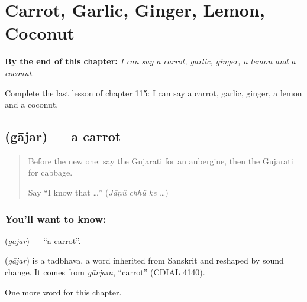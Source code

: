 
\chapter{Carrot, Garlic, Ginger, Lemon, Coconut}
\label{ch:gu-carrot-garlic-ginger-lemon-coconut}

\begin{chapteropening}
\textbf{By the end of this chapter:} \emph{I can say a carrot, garlic, ginger, a lemon and a coconut.}

Complete the last lesson of chapter 115: I can say a carrot, garlic, ginger, a lemon and a coconut.
\end{chapteropening}

\section[\texorpdfstring{\gu{ગાજર} (gājar)}{ગાજર (gājar)}]{ (gājar) — a carrot}

\label{lesson:GU-C115-gajar}



\begin{quote}
Before the new one: say the Gujarati for an aubergine, then the Gujarati for cabbage.

Say \textquotedblleft{}I know that …\textquotedblright{} (\emph{Jāṇũ chhũ ke …})
\end{quote}

\subsection*{You'll want to know: }
\textbf{} (\emph{gājar}) — \textquotedblleft{}a carrot\textquotedblright{}.

\begin{cousinweb}
\textbf{} (\emph{gājar}) is a tadbhava, a word inherited from Sanskrit and reshaped by sound change. It comes from \emph{gārjara}, \textquotedblleft{}carrot\textquotedblright{} (CDIAL 4140).
\end{cousinweb}

\begin{grammarlens}[title={What you've built}]
One more word for this chapter.
\end{grammarlens}

